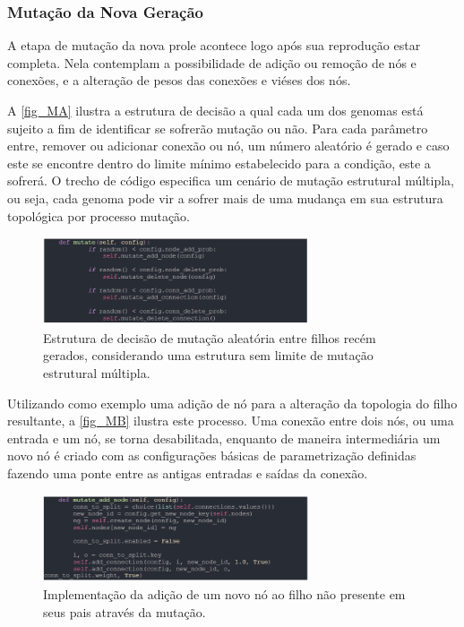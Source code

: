 \subsubsection{Mutação da Nova Geração}
A etapa de mutação da nova prole acontece logo após sua reprodução estar completa. Nela contemplam a
possibilidade de adição ou remoção de nós e conexões, e a alteração de pesos das conexões e viéses dos nós.

A \autoref{fig_MA} ilustra a estrutura de decisão a qual cada um dos genomas está sujeito a fim de
identificar se sofrerão mutação ou não. Para cada parâmetro entre, remover ou adicionar conexão ou nó,
um número aleatório é gerado e caso este se encontre dentro do limite mínimo estabelecido para a condição,
este a sofrerá. O trecho de código especifica um cenário de mutação estrutural múltipla, ou seja,
cada genoma pode vir a sofrer mais de uma mudança em sua estrutura topológica por processo mutação.

\begin{figure}[htb]
        \centering
        \caption{\label{fig_MA}Estrutura de decisão de mutação aleatória entre filhos recém gerados, considerando uma estrutura sem limite de mutação estrutural múltipla.}
        \includegraphics[width=0.7\textwidth]{images/MA.png}
\end{figure}

Utilizando como exemplo uma adição de nó para a alteração da topologia do
filho resultante, a \autoref{fig_MB} ilustra este processo. Uma conexão entre dois nós,
ou uma entrada e um nó, se torna desabilitada, enquanto de maneira intermediária um novo
nó é criado com as configurações básicas de parametrização definidas fazendo uma ponte
entre as antigas entradas e saídas da conexão.

\begin{figure}[htb]
        \centering
        \caption{\label{fig_MB}Implementação da adição de um novo nó ao filho não presente em seus pais através da mutação.}
        \includegraphics[width=0.7\textwidth]{images/MB.png}
\end{figure}


